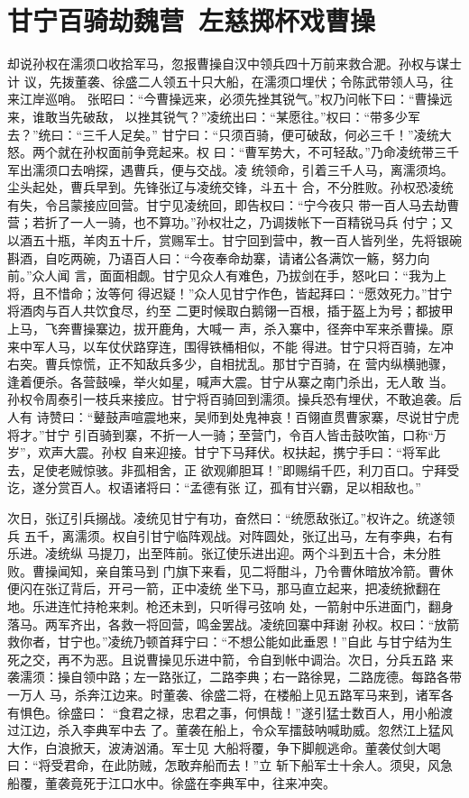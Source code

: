 \chapter{甘宁百骑劫魏营~左慈掷杯戏曹操}

却说孙权在濡须口收拾军马，忽报曹操自汉中领兵四十万前来救合淝。孙权与谋士计
议，先拨董袭、徐盛二人领五十只大船，在濡须口埋伏；令陈武带领人马，往来江岸巡哨。
张昭曰：“今曹操远来，必须先挫其锐气。”权乃问帐下曰：“曹操远来，谁敢当先破敌，
以挫其锐气？”凌统出曰：“某愿往。”权曰：“带多少军去？”统曰：“三千人足矣。”
甘宁曰：“只须百骑，便可破敌，何必三千！”凌统大怒。两个就在孙权面前争竞起来。权
曰：“曹军势大，不可轻敌。”乃命凌统带三千军出濡须口去哨探，遇曹兵，便与交战。凌
统领命，引着三千人马，离濡须坞。尘头起处，曹兵早到。先锋张辽与凌统交锋，斗五十
合，不分胜败。孙权恐凌统有失，令吕蒙接应回营。甘宁见凌统回，即告权曰：“宁今夜只
带一百人马去劫曹营；若折了一人一骑，也不算功。”孙权壮之，乃调拨帐下一百精锐马兵
付宁；又以酒五十瓶，羊肉五十斤，赏赐军士。甘宁回到营中，教一百人皆列坐，先将银碗
斟酒，自吃两碗，乃语百人曰：“今夜奉命劫寨，请诸公各满饮一觞，努力向前。”众人闻
言，面面相觑。甘宁见众人有难色，乃拔剑在手，怒叱曰：“我为上将，且不惜命；汝等何
得迟疑！”众人见甘宁作色，皆起拜曰：“愿效死力。”甘宁将酒肉与百人共饮食尽，约至
二更时候取白鹅翎一百根，插于盔上为号；都披甲上马，飞奔曹操寨边，拔开鹿角，大喊一
声，杀入寨中，径奔中军来杀曹操。原来中军人马，以车仗伏路穿连，围得铁桶相似，不能
得进。甘宁只将百骑，左冲右突。曹兵惊慌，正不知敌兵多少，自相扰乱。那甘宁百骑，在
营内纵横驰骤，逢着便杀。各营鼓噪，举火如星，喊声大震。甘宁从寨之南门杀出，无人敢
当。孙权令周泰引一枝兵来接应。甘宁将百骑回到濡须。操兵恐有埋伏，不敢追袭。后人有
诗赞曰：“鼙鼓声喧震地来，吴师到处鬼神哀！百翎直贯曹家寨，尽说甘宁虎将才。”甘宁
引百骑到寨，不折一人一骑；至营门，令百人皆击鼓吹笛，口称“万岁”，欢声大震。孙权
自来迎接。甘宁下马拜伏。权扶起，携宁手曰：“将军此去，足使老贼惊骇。非孤相舍，正
欲观卿胆耳！”即赐绢千匹，利刀百口。宁拜受讫，遂分赏百人。权语诸将曰：“孟德有张
辽，孤有甘兴霸，足以相敌也。”

次日，张辽引兵搦战。凌统见甘宁有功，奋然曰：“统愿敌张辽。”权许之。统遂领兵
五千，离濡须。权自引甘宁临阵观战。对阵圆处，张辽出马，左有李典，右有乐进。凌统纵
马提刀，出至阵前。张辽使乐进出迎。两个斗到五十合，未分胜败。曹操闻知，亲自策马到
门旗下来看，见二将酣斗，乃令曹休暗放冷箭。曹休便闪在张辽背后，开弓一箭，正中凌统
坐下马，那马直立起来，把凌统掀翻在地。乐进连忙持枪来刺。枪还未到，只听得弓弦响
处，一箭射中乐进面门，翻身落马。两军齐出，各救一将回营，鸣金罢战。凌统回寨中拜谢
孙权。权曰：“放箭救你者，甘宁也。”凌统乃顿首拜宁曰：“不想公能如此垂恩！”自此
与甘宁结为生死之交，再不为恶。且说曹操见乐进中箭，令自到帐中调治。次日，分兵五路
来袭濡须：操自领中路；左一路张辽，二路李典；右一路徐晃，二路庞德。每路各带一万人
马，杀奔江边来。时董袭、徐盛二将，在楼船上见五路军马来到，诸军各有惧色。徐盛曰：
“食君之禄，忠君之事，何惧哉！”遂引猛士数百人，用小船渡过江边，杀入李典军中去
了。董袭在船上，令众军擂鼓呐喊助威。忽然江上猛风大作，白浪掀天，波涛汹涌。军士见
大船将覆，争下脚舰逃命。董袭仗剑大喝曰：“将受君命，在此防贼，怎敢弃船而去！”立
斩下船军士十余人。须臾，风急船覆，董袭竟死于江口水中。徐盛在李典军中，往来冲突。


